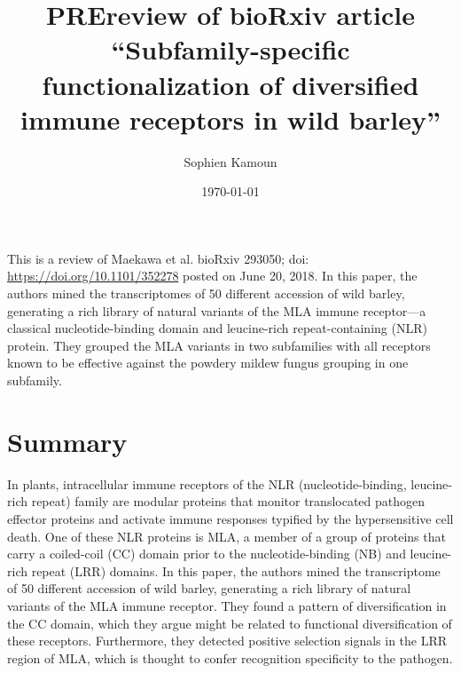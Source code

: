 \documentclass[10pt]{article}
\renewenvironment{abstract}
  {{\bfseries\noindent{\abstractname}\par\nobreak}\footnotesize}
  {\bigskip}
\begin{document}
\title{PREreview of bioRxiv article ``Subfamily-specific functionalization of
diversified immune receptors in wild barley''}



\author[1]{Sophien Kamoun}%
%


\vspace{-1em}



  \date{\today}


\begingroup
\let\center\flushleft
\let\endcenter\endflushleft
\maketitle
\endgroup





\begin{abstract}
This is a review of Maekawa et al. bioRxiv 293050; doi:
\url{https://doi.org/10.1101/352278} posted on June 20, 2018. In this
paper, the authors mined the transcriptomes of 50 different accession of
wild barley, generating a rich library of natural variants of the MLA
immune receptor---a classical nucleotide-binding domain and leucine-rich
repeat-containing (NLR) protein. They grouped the MLA variants in two
subfamilies with all receptors known to be effective against the powdery
mildew fungus grouping in one subfamily.%
\end{abstract}%




\par\null

\section*{Summary}

{\label{216049}}\par\null

In plants, intracellular immune receptors of the NLR
(nucleotide-binding, leucine-rich repeat) family are modular proteins
that monitor translocated pathogen effector proteins and activate immune
responses typified by the hypersensitive cell death. One of these NLR
proteins is MLA, a member of a group of proteins that carry a
coiled-coil (CC) domain prior to the nucleotide-binding (NB) and
leucine-rich repeat (LRR) domains. In this paper, the authors mined the
transcriptome of 50 different accession of wild barley, generating a
rich library of natural variants of the MLA immune receptor. They found
a pattern of diversification in the CC domain, which they argue might be
related to functional diversification of these receptors. Furthermore,
they detected positive selection signals in the LRR region of MLA, which
is thought to confer recognition specificity to the pathogen.
\end{document}
